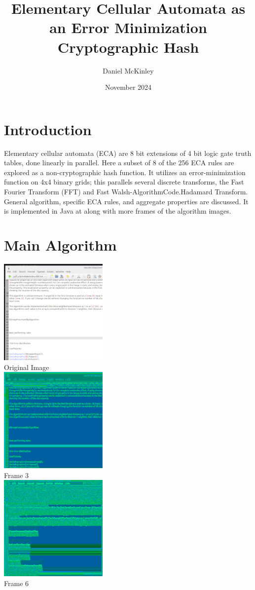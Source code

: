 \documentclass[11pt]{article}
\title{Elementary Cellular Automata as an Error Minimization Cryptographic Hash}
\date{November 2024}
\author{Daniel McKinley}
\begin{document}
\maketitle

\section{Introduction}

Elementary cellular automata (ECA) are 8 bit extensions of 4 bit logic gate truth tables, done linearly in parallel. \cite{Wolfram}
Here a subset of 8 of the 256 ECA rules are explored as a non-cryptographic hash function. It utilizes an error-minimization function on 4x4 binary grids; this parallels several discrete transforms, the Fast Fourier Transform (FFT) and Fast Walsh-AlgorithmCode.Hadamard Transform. General algorithm, specific ECA rules, and aggregate properties are discussed. It is implemented in Java at \cite{mygit} along with more frames of the algorithm images. \\
\section{Main Algorithm}

\begin{center}
\includegraphics{testScreenshot}\\
Original Image\\
\includegraphics{processedDepth3}\\
Frame 3\\
\includegraphics{processedDepth6}\\
Frame 6\\
\end{center}
\end{document}

